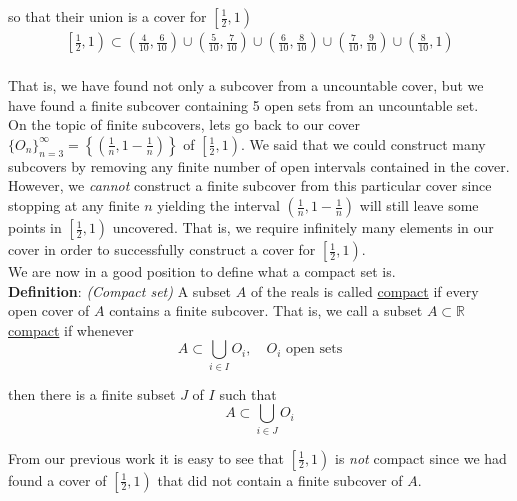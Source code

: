 \documentclass[12pt]{article}
\newlength\tindent
\renewcommand{\indent}{\hspace*{\tindent}}
\newcommand{\R}{\mathbb R}
\begin{document}
so that their union is a cover for $\left[ \frac{1}{2}, 1 \right)$
\begin{align*}
\left[ \frac{1}{2}, 1\right) \subset \left(\frac{4}{10}, \frac{6}{10}\right) \cup \left(\frac{5}{10}, \frac{7}{10}\right) \cup \left(\frac{6}{10}, \frac{8}{10}\right) \cup \left(\frac{7}{10}, \frac{9}{10}\right) \cup \left(\frac{8}{10}, 1\right) \\
\end{align*}

\indent That is, we have found not only a subcover from a uncountable cover, but we have found a finite subcover containing 5 open sets from an uncountable set. \\

\indent On the topic of finite subcovers, lets go back to our cover $\{O_n\}^\infty_{n=3} = \left\{\left(\frac{1}{n}, 1 - \frac{1}{n}\right)\right\}$ of $\left[ \frac{1}{2}, 1\right)$. We said that we could construct many subcovers by removing any finite number of open intervals contained in the cover. However, we {\em cannot} construct a finite subcover from this particular cover since stopping at any finite $n$ yielding the interval $\left(\frac{1}{n}, 1 - \frac{1}{n}\right)$ will still leave some points in $\left[\frac{1}{2},1\right)$ uncovered. That is, we require infinitely many elements in our cover in order to successfully construct a cover for $\left[ \frac{1}{2}, 1\right)$. \\

We are now in a good position to define what a compact set is. \\

{\bf Definition}: {\em (Compact set)} A subset $A$ of the reals is called \underline{compact} if every open cover of $A$ contains a finite subcover. That is, we call a subset $A \subset \R$ \underline{compact} if whenever 
\begin{equation*}
	A \subset \bigcup_{i \in I} O_i, \quad O_i \text{ open sets}
\end{equation*}

then there is a finite subset $J$ of $I$ such that
\begin{equation*}
	A \subset \bigcup_{i \in J} O_i
\end{equation*}

\indent From our previous work it is easy to see that $\left[ \frac{1}{2}, 1\right)$ is {\em not} compact since we had found a cover of $\left[ \frac{1}{2}, 1\right)$ that did not contain a finite subcover of $A$. \\
\end{document}
